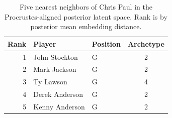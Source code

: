 \begin{table}[htbp]
  \centering\small
  \begin{tabular}{rllc}
    \toprule
    Rank & Player & Position & Archetype \\
    \midrule
    1 & John Stockton & G & 2 \\
    2 & Mark Jackson & G & 2 \\
    3 & Ty Lawson & G & 4 \\
    4 & Derek Anderson & G & 2 \\
    5 & Kenny Anderson & G & 2 \\
    \bottomrule
  \end{tabular}
  \caption{Five nearest neighbors of Chris Paul in the Procrustes-aligned posterior latent space. Rank is by posterior mean embedding distance.}
  \label{tab:Chris_Paul_neighbors}
\end{table}

